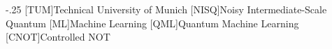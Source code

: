 \documentclass[headsepline,footsepline,footinclude=false,oneside,fontsize=11pt,paper=a4,listof=totoc,bibliography=totoc]{scrbook} %
\begin{document}


\frontmatter{}





\tableofcontents{}

\mainmatter{}







\appendix{}


\begin{acronym}
	\itemsep-.25\baselineskip{}
	[TUM]{Technical University of Munich}
	[NISQ]{Noisy Intermediate-Scale Quantum}
	[ML]{Machine Learning}
	[QML]{Quantum Machine Learning}
	[CNOT]{Controlled NOT}
\end{acronym}

\listoffigures{}
\listoftables{}
\printbibliography{}
\end{document}
